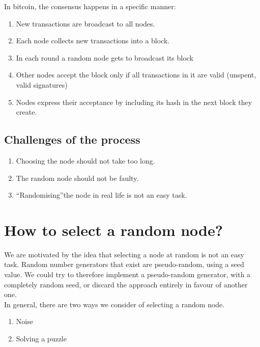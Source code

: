 \documentclass[10pt,a4paper]{article}
\begin{document}
In bitcoin, the consensus happens in a specific manner:
\begin{enumerate}
\item New transactions are broadcast to all nodes.

\item Each node collects new transactions into a block.

\item In each round a random node gets to broadcast its block

\item Other nodes accept the block only if all transactions in it are valid (unspent, valid signatures)

\item Nodes express their acceptance by including its hash in the next block they create.
\end{enumerate}


\subsection{Challenges of the process}
\begin{enumerate}
\item Choosing the node should not take too long.

\item The random node should not be faulty.

\item \textquotedblleft Randomising\textquotedblright  the node in real life is not an easy task.
\end{enumerate}


\section{How to select a random node?}
We are motivated by the idea that selecting a node at random is not an easy task. Random number generators that exist are pseudo-random, using a seed value. We could try to therefore implement a pseudo-random generator, with a completely random seed, or discard the approach entirely in favour of another one.\\
In general, there are two ways we consider of selecting a random node. 
\begin{enumerate}
\item Noise

\item Solving a puzzle
\end{enumerate}
\end{document}
